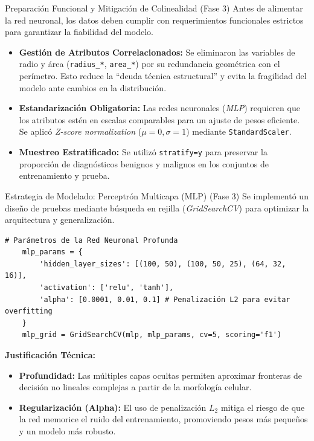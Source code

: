 \documentclass{beamer}
\begin{document}
	\begin{frame}{Preparación Funcional y Mitigación de Colinealidad (Fase 3)}
		Antes de alimentar la red neuronal, los datos deben cumplir con requerimientos funcionales estrictos para garantizar la fiabilidad del modelo.
		
		\begin{itemize}
			\item<2-> \textbf{Gestión de Atributos Correlacionados:} Se eliminaron las variables de radio y área (\texttt{radius\_*}, \texttt{area\_*}) por su redundancia geométrica con el perímetro. Esto reduce la ``deuda técnica estructural'' y evita la fragilidad del modelo ante cambios en la distribución.
			\item<3-> \textbf{Estandarización Obligatoria:} Las redes neuronales (\textit{MLP}) requieren que los atributos estén en escalas comparables para un ajuste de pesos eficiente. Se aplicó \textit{Z-score normalization} ($\mu=0, \sigma=1$) mediante \texttt{StandardScaler}.
			\item<4-> \textbf{Muestreo Estratificado:} Se utilizó \texttt{stratify=y} para preservar la proporción de diagnósticos benignos y malignos en los conjuntos de entrenamiento y prueba.
		\end{itemize}
	\end{frame}
	
	\begin{frame}[fragile]{Estrategia de Modelado: Perceptrón Multicapa (MLP) (Fase 3)}
		Se implementó un diseño de pruebas mediante búsqueda en rejilla (\textit{GridSearchCV}) para optimizar la arquitectura y generalización.
		
		\begin{lstlisting}[style=colab]
	# Parámetros de la Red Neuronal Profunda
	mlp_params = {
		'hidden_layer_sizes': [(100, 50), (100, 50, 25), (64, 32, 16)],
		'activation': ['relu', 'tanh'], 
		'alpha': [0.0001, 0.01, 0.1] # Penalización L2 para evitar overfitting
	}
	mlp_grid = GridSearchCV(mlp, mlp_params, cv=5, scoring='f1')
		\end{lstlisting}
		
		\textbf{Justificación Técnica:}
		\begin{itemize}
			\item<3-> \textbf{Profundidad:} Las múltiples capas ocultas permiten aproximar fronteras de decisión no lineales complejas a partir de la morfología celular.
			\item<4-> \textbf{Regularización (Alpha):} El uso de penalización $L_2$ mitiga el riesgo de que la red memorice el ruido del entrenamiento, promoviendo pesos más pequeños y un modelo más robusto.
		\end{itemize}
	\end{frame}
	
\end{document}
